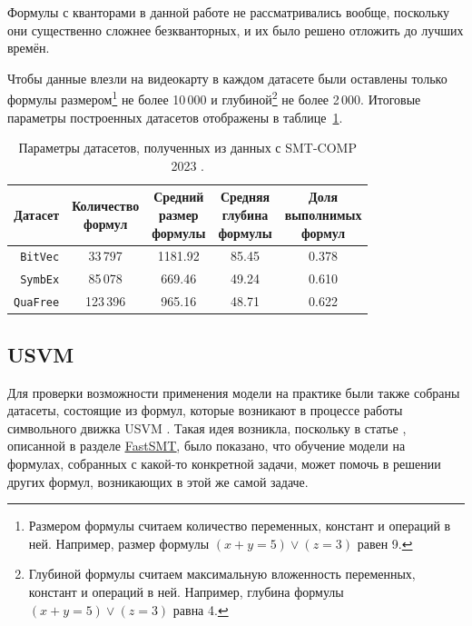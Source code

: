 Формулы с кванторами в данной работе не рассматривались вообще, поскольку они существенно сложнее безкванторных, и их было решено отложить до лучших времён.

Чтобы данные влезли на видеокарту в каждом датасете были оставлены только формулы размером\footnote{Размером формулы считаем количество переменных, констант и операций в ней. Например, размер формулы $(x + y = 5) \vee (z = 3)$ равен 9.} не более 10\,000 и глубиной\footnote{Глубиной формулы считаем максимальную вложенность переменных, констант и операций в ней. Например, глубина формулы $(x + y = 5) \vee (z = 3)$ равна 4.} не более 2\,000. Итоговые параметры построенных датасетов отображены в таблице~\ref{smt-comp-datasets-table}.

\begin{table}[ht]
\begin{center}
\begin{tabular}{r|cccc}
    Датасет & \makecell{Количество \\ формул} & \makecell{Средний \\ размер \\ формулы} & \makecell{Средняя \\ глубина \\ формулы} & \makecell{Доля \\ выполнимых \\ формул} \\
    \hline \hline
    \rule{0pt}{2.5ex}
    \texttt{BitVec}  &  33\,797 & 1181.92 & 85.45 & 0.378 \\
    \texttt{SymbEx}  &  85\,078 &  669.46 & 49.24 & 0.610 \\
    \texttt{QuaFree} & 123\,396 &  965.16 & 48.71 & 0.622 \\
\end{tabular}
\caption{\label{smt-comp-datasets-table} Параметры датасетов, полученных из данных с SMT-COMP 2023 \cite{smt-comp-2023-benchmarks}.}
\end{center}
\end{table}

\subsection{USVM} \label{usvm-datasets-desc}

Для проверки возможности применения модели на практике были также собраны датасеты, состоящие из формул, которые возникают в процессе работы символьного движка USVM \cite{usvm-diploma}. Такая идея возникла, поскольку в статье \cite{fastsmt-paper}, описанной в разделе \underline{\hyperref[fastsmt]{FastSMT}}, было показано, что обучение модели на формулах, собранных с какой-то конкретной задачи, может помочь в решении других формул, возникающих в этой же самой задаче.

